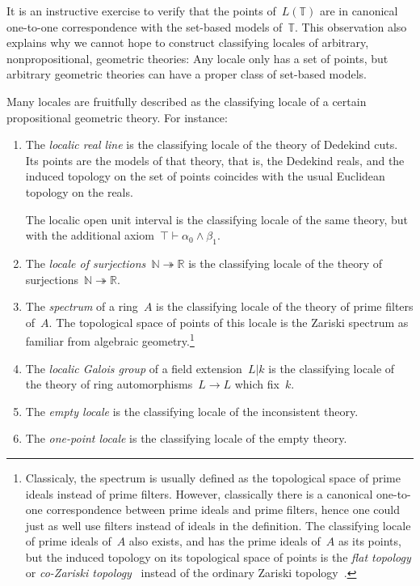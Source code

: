\documentclass{ws-rv9x6}
\newcommand{\NN}{\mathbb{N}}
\newcommand{\RR}{\mathbb{R}}
\newcommand{\TT}{\mathbb{T}}
\renewcommand{\_}{\mathpunct{.}}
\newcommand{\?}{\,{:}\,}
\begin{document}
It is an instructive exercise to verify that the points of~$L(\TT)$ are in
canonical one-to-one correspondence with the set-based models of~$\TT$. This
observation also explains why we cannot hope to construct classifying
locales of arbitrary, nonpropositional, geometric theories: Any locale only has
a set of points, but arbitrary geometric theories can have a proper class of
set-based models.

Many locales are fruitfully described as the classifying locale of a certain
propositional geometric theory. For instance:
\begin{enumerate}
\item The \emph{localic real line} is the classifying locale of the theory of
Dedekind cuts. Its points are the models of that theory, that is, the Dedekind
reals, and the induced topology on the set of points coincides with the usual
Euclidean topology on the reals.

The localic open unit interval is the classifying locale of the
same theory, but with the additional axiom~$\top \vdash \alpha_0 \wedge \beta_1$.
\item The \emph{locale of surjections~$\NN \twoheadrightarrow \RR$} is the
classifying locale of the theory of surjections~$\NN \twoheadrightarrow \RR$.
\item The \emph{spectrum} of a ring~$A$ is the classifying locale of the
theory of prime filters of~$A$. The topological space of points of this locale
is the Zariski spectrum as familiar from algebraic
geometry.\footnote{Classicaly, the spectrum is usually defined as the
topological space of prime ideals instead of prime filters. However,
classically there is a canonical one-to-one correspondence between prime ideals
and prime filters, hence one could just as well use filters instead of ideals
in the definition. The classifying locale of prime ideals of~$A$ also exists,
and has the prime ideals of~$A$ as its points, but the induced topology on its
topological space of points is the \emph{flat topology} or \emph{co-Zariski
topology}~\cite{tarizadeh:flat} instead of the ordinary
Zariski topology~\cite[Proposition~4.5]{johnstone:rings-fields-and-spectra}.}
\item The \emph{localic Galois group} of a field extension~$L|k$ is the
classifying locale of the theory of ring automorphisms~$L \to L$ which fix~$k$.
\item The \emph{empty locale} is the classifying locale of the inconsistent theory.
\item The \emph{one-point locale} is the classifying locale of the empty theory.
\end{enumerate}
\end{document}
